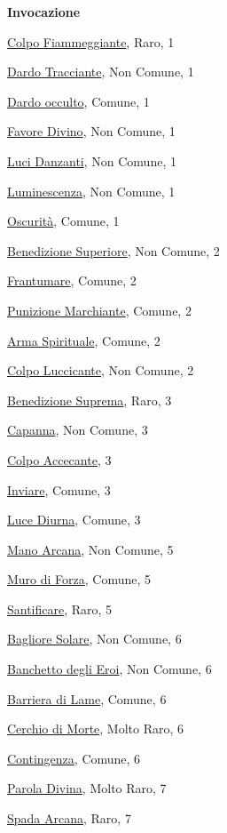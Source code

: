 \begin{multicols}{3}
{{\medskip\textbf{Invocazione}

\hyperlink{Colpo Fiammeggiante}{Colpo Fiammeggiante}, Raro, 1

\hyperlink{Dardo Tracciante}{Dardo Tracciante}, Non Comune, 1

\hyperlink{Dardo occulto}{Dardo occulto}, Comune, 1

\hyperlink{Favore Divino}{Favore Divino}, Non Comune, 1

\hyperlink{Luci Danzanti}{Luci Danzanti}, Non Comune, 1

\hyperlink{Luminescenza}{Luminescenza}, Non Comune, 1

\hyperlink{Oscurità}{Oscurità}, Comune, 1

\hyperlink{Benedizione Superiore}{Benedizione Superiore}, Non Comune, 2

\hyperlink{Frantumare}{Frantumare}, Comune, 2

\hyperlink{Punizione Marchiante}{Punizione Marchiante}, Comune, 2

\hyperlink{Arma Spirituale}{Arma Spirituale}, Comune, 2

\hyperlink{Colpo Luccicante}{Colpo Luccicante}, Non Comune, 2

\hyperlink{Benedizione Suprema}{Benedizione Suprema}, Raro, 3

\hyperlink{Capanna}{Capanna}, Non Comune, 3

\hyperlink{Colpo Accecante}{Colpo Accecante}, 3

\hyperlink{Inviare}{Inviare}, Comune, 3

\hyperlink{Luce Diurna}{Luce Diurna}, Comune, 3

\hyperlink{Mano Arcana}{Mano Arcana}, Non Comune, 5

\hyperlink{Muro di Forza}{Muro di Forza}, Comune, 5

\hyperlink{Santificare}{Santificare}, Raro, 5

\hyperlink{Bagliore Solare}{Bagliore Solare}, Non Comune, 6

\hyperlink{Banchetto degli Eroi}{Banchetto degli Eroi}, Non Comune, 6

\hyperlink{Barriera di Lame}{Barriera di Lame}, Comune, 6

\hyperlink{Cerchio di Morte}{Cerchio di Morte}, Molto Raro, 6

\hyperlink{Contingenza}{Contingenza}, Comune, 6

\hyperlink{Parola Divina}{Parola Divina}, Molto Raro, 7

\hyperlink{Spada Arcana}{Spada Arcana}, Raro, 7

}}
\end{multicols}
